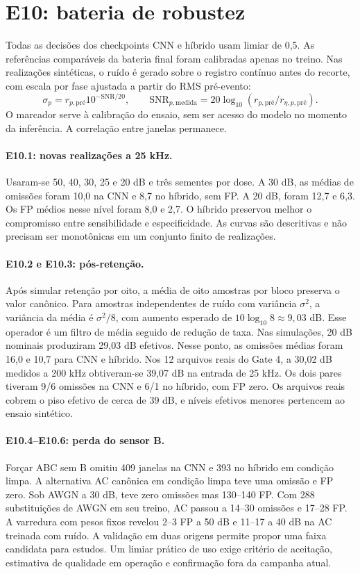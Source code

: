 \documentclass[11pt,a4paper]{article}
\begin{document}
\section{E10: bateria de robustez}
Todas as decisões dos checkpoints CNN e híbrido usam limiar de 0,5. As referências comparáveis da bateria final foram calibradas apenas no treino. Nas realizações sintéticas, o ruído é gerado sobre o registro contínuo antes do recorte, com escala por fase ajustada a partir do RMS pré-evento:
\[
 \sigma_p=r_{p,\mathrm{pré}}10^{-\mathrm{SNR}/20},\qquad
 \mathrm{SNR}_{p,\mathrm{medida}}=20\log_{10}(r_{p,\mathrm{pré}}/r_{\eta,p,\mathrm{pré}}).
\]
O marcador serve à calibração do ensaio, sem ser acesso do modelo no momento da inferência. A correlação entre janelas permanece.

\paragraph{E10.1: novas realizações a 25 kHz.} Usaram-se 50, 40, 30, 25 e 20 dB e três sementes por dose. A 30 dB, as médias de omissões foram 10,0 na CNN e 8,7 no híbrido, sem FP. A 20 dB, foram 12,7 e 6,3. Os FP médios nesse nível foram 8,0 e 2,7. O híbrido preservou melhor o compromisso entre sensibilidade e especificidade. As curvas são descritivas e não precisam ser monotônicas em um conjunto finito de realizações.

\paragraph{E10.2 e E10.3: pós-retenção.} Após simular retenção por oito, a média de oito amostras por bloco preserva o valor canônico. Para amostras independentes de ruído com variância $\sigma^2$, a variância da média é $\sigma^2/8$, com aumento esperado de $10\log_{10}8\approx9,03$ dB. Esse operador é um filtro de média seguido de redução de taxa. Nas simulações, 20 dB nominais produziram 29,03 dB efetivos. Nesse ponto, as omissões médias foram 16,0 e 10,7 para CNN e híbrido. Nos 12 arquivos reais do Gate 4, a 30,02 dB medidos a 200 kHz obtiveram-se 39,07 dB na entrada de 25 kHz. Os dois pares tiveram 9/6 omissões na CNN e 6/1 no híbrido, com FP zero. Os arquivos reais cobrem o piso efetivo de cerca de 39 dB, e níveis efetivos menores pertencem ao ensaio sintético.

\paragraph{E10.4--E10.6: perda do sensor B.} Forçar ABC sem B omitiu 409 janelas na CNN e 393 no híbrido em condição limpa. A alternativa AC canônica em condição limpa teve uma omissão e FP zero. Sob AWGN a 30 dB, teve zero omissões mas 130--140 FP. Com 288 substituições de AWGN em seu treino, AC passou a 14--30 omissões e 17--28 FP. A varredura com pesos fixos revelou 2--3 FP a 50 dB e 11--17 a 40 dB na AC treinada com ruído. A validação em duas origens permite propor uma faixa candidata para estudos. Um limiar prático de uso exige critério de aceitação, estimativa de qualidade em operação e confirmação fora da campanha atual.
\end{document}
